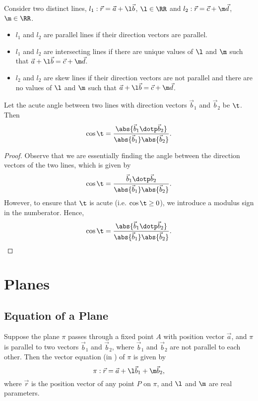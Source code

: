 \begin{recipe}
    Consider two distinct lines, $l_1 : \vec r = \vec a + \l \vec b$, $\l \in \RR$ and $l_2 : \vec r = \vec c + \m \vec d$, $\m \in \RR$.
    \begin{itemize}
        \item $l_1$ and $l_2$ are parallel lines if their direction vectors are parallel.
        \item $l_1$ and $l_2$ are intersecting lines if there are unique values of $\l$ and $\m$ such that $\vec a + \l \vec b = \vec c + \m \vec d$.
        \item $l_2$ and $l_2$ are skew lines if their direction vectors are not parallel and there are no values of $\l$ and $\m$ such that $\vec a + \l \vec b = \vec c + \m \vec d$.
    \end{itemize}
\end{recipe}

\begin{proposition}
    Let the acute angle between two lines with direction vectors $\vec b_1$ and $\vec b_2$ be $\t$. Then \[\cos\t = \frac{\abs{\vec b_1 \dotp \vec b_2}}{\abs{\vec b_1} \abs{\vec b_2}}.\]
\end{proposition}
\begin{proof}
    Observe that we are essentially finding the angle between the direction vectors of the two lines, which is given by \[\cos\t = \frac{\vec b_1 \dotp \vec b_2}{\abs{\vec b_1} \abs{\vec b_2}}.\] However, to ensure that $\t$ is acute (i.e. $\cos \t \geq 0$), we introduce a modulus sign in the numberator. Hence, \[\cos\t = \frac{\abs{\vec b_1 \dotp \vec b_2}}{\abs{\vec b_1} \abs{\vec b_2}}.\]
\end{proof}

\section{Planes}


\subsection{Equation of a Plane}

\begin{definition}
    Suppose the plane $\pi$ passes through a fixed point $A$ with position vector $\vec a$, and $\pi$ is parallel to two vectors $\vec b_1$ and $\vec b_2$, where $\vec b_1$ and $\vec b_2$ are not parallel to each other. Then the vector equation (in ) of $\pi$ is given by \[\pi : \vec r = \vec a + \l \vec b_1 + \m \vec b_2,\] where $\vec r$ is the position vector of any point $P$ on $\pi$, and $\l$ and $\m$ are real parameters.
\end{definition}

